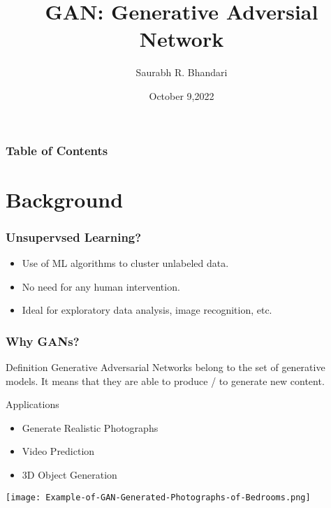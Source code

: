 \documentclass{beamer}
\title[GANs] %
{GAN: Generative Adversial Network}
\author[Saurabh R. Bhandari] %
{Saurabh R. Bhandari}
\institute[BITS Pilani] %
{
  Birla Institute of Technology and Science,Pilani\\
  f20212412@pilani.bits-pilani.ac.in\\
  https://github.com/SaurabhRBhandari\\
}
\date[October 9,2022] %
{October 9,2022}
\begin{document}
\frame{\titlepage}


\begin{frame}
\frametitle{Table of Contents}
\tableofcontents
\end{frame}

\section{Background}
\begin{frame}
\frametitle{Unsupervsed Learning?}
\begin{itemize}
    \item Use of ML algorithms to cluster unlabeled data.
    \item No need for any human intervention.
    \item Ideal for exploratory data analysis, image recognition, etc.
\end{itemize}
\end{frame}
\begin{frame}
\frametitle{Why GANs?}
\begin{block}{Definition}
Generative Adversarial Networks belong to the set of generative models. It means that they are able to produce / to generate  new content.
\end{block}
\begin{alertblock}{Applications}
\begin{itemize}
    \item Generate Realistic Photographs
    \item Video Prediction
    \item 3D Object Generation
\end{itemize}
\end{alertblock}
\texttt{[image: Example-of-GAN-Generated-Photographs-of-Bedrooms.png]}
\end{frame}
\end{document}
